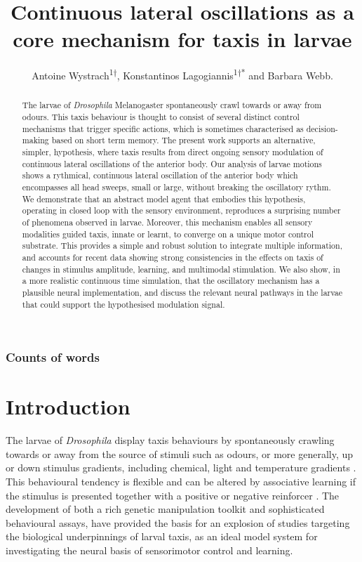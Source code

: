 \documentclass[10pt,a4paper]{article}
\author{Antoine Wystrach\textsuperscript{1†}, Konstantinos Lagogiannis\textsuperscript{1†*} and Barbara Webb.}
\title{Continuous lateral oscillations as a core mechanism for taxis in \Dros larvae}
\newcommand\wordcount{} %
\newcommand{\Dros }{\emph{Drosophila }}
\begin{document}
\subsubsection*{Counts of words} 
\wordcount

\maketitle
\begin{abstract}
The larvae of \Dros  Melanogaster spontaneously crawl towards or away from odours. This taxis behaviour is thought to consist of several distinct control mechanisms that trigger specific actions, which is sometimes characterised as decision-making based on short term memory. The present work supports an alternative, simpler, hypothesis, where taxis results from direct ongoing sensory modulation of continuous lateral oscillations of the anterior body. Our analysis of larvae motions shows a rythmical, continuous lateral oscillation of the anterior body which encompasses all head sweeps, small or large, without breaking the oscillatory rythm.  We demonstrate that an abstract model agent that embodies this hypothesis, operating in closed loop with the sensory environment, reproduces a surprising number of phenomena observed in larvae. Moreover, this mechanism enables all sensory modalities guided taxis, innate or learnt, to converge on a unique motor control substrate. This provides a simple and robust solution to integrate multiple information, and accounts for recent data showing strong consistencies in the effects on taxis of changes in stimulus amplitude, learning, and multimodal stimulation. We also show, in a more realistic continuous time simulation, that the oscillatory mechanism has a plausible neural implementation, and discuss the relevant neural pathways in the larvae that could support the hypothesised modulation signal.
\end{abstract}

\section{Introduction}
The larvae of \Dros display taxis behaviours by spontaneously crawling towards or away from the source of stimuli such as odours, or more generally, up or down stimulus gradients, including chemical, light and temperature gradients \citep{luo2010navigational,gomez2011active,gomez2012active,gomez2014multilevel,kane2013sensorimotor,klein2015sensory}. This behavioural tendency is flexible and can be altered by associative learning if the stimulus is presented together with a positive or negative reinforcer \citep{ache2005olfaction,scherer2003olfactory,gerber2004engram,diegelmann2013maggot,schleyer2015learning}. The development of both a rich genetic manipulation toolkit and sophisticated behavioural assays, \citep{gerber2009smelling,diegelmann2013maggot} have provided the basis for an explosion of studies targeting the biological underpinnings of larval taxis, as an ideal model system for investigating the neural basis of sensorimotor control and learning.
\end{document}
